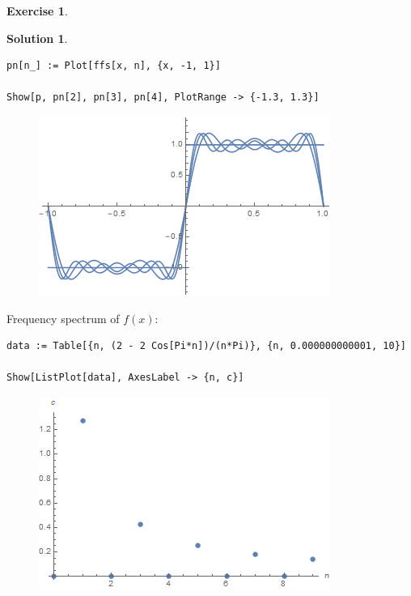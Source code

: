 \documentclass{book}
\theoremstyle{definition}
\newtheorem*{exer*}{Exercise}
\newtheorem*{sln*}{Solution}
\begin{document}
\begin{exer*}
\begin{sln*}
\begin{lstlisting}
pn[n_] := Plot[ffs[x, n], {x, -1, 1}]

Show[p, pn[2], pn[3], pn[4], PlotRange -> {-1.3, 1.3}]
		\end{lstlisting}
		
		\begin{figure}[h!]
			\centering
			\includegraphics[scale=0.75]{ffs1.png}
		\end{figure}
	
		Frequency spectrum of $f(x)$:
		
		\begin{lstlisting}
data := Table[{n, (2 - 2 Cos[Pi*n])/(n*Pi)}, {n, 0.000000000001, 10}]

Show[ListPlot[data], AxesLabel -> {n, c}]
		\end{lstlisting}
	
		\begin{figure}[h!]
			\centering
			\includegraphics[scale=0.75]{ffs2.png}
		\end{figure}
		
	\end{sln*}
\end{exer*}

\newpage
\end{document}
